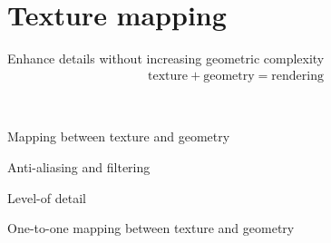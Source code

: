 \chapter{Texture mapping}
Enhance details without increasing geometric complexity
\begin{gather*}
	\text{texture}+\text{geometry}=\text{rendering}
\end{gather*}
\begin{compactdesc}
	\item[\lp{Issues}]\hfill\\
\begin{enumerate*}[label=\protect\circled{\arabic*},itemjoin=]
	\item Mapping between texture and geometry\\
	\item Anti-aliasing and filtering\\
	\item Level-of detail\\
	\item One-to-one mapping between texture and geometry\\
\end{enumerate*}

\end{compactdesc}

